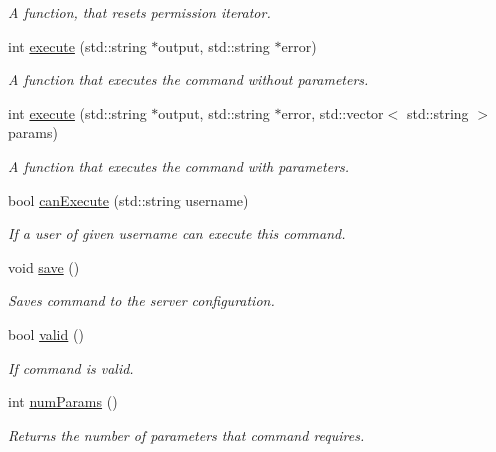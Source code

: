 \begin{DoxyCompactItemize}
\begin{DoxyCompactList}\small\item\em A function, that resets permission iterator. \end{DoxyCompactList}\item 
int \hyperlink{class_r_c_f_1_1_server_1_1_command_a2bfddcda74c6eaf33c7305cbfb69abf6}{execute} (std\+::string $\ast$output, std\+::string $\ast$error)
\begin{DoxyCompactList}\small\item\em A function that executes the command without parameters. \end{DoxyCompactList}\item 
int \hyperlink{class_r_c_f_1_1_server_1_1_command_a3d73b9e428db4ae2bd37af0a248ab140}{execute} (std\+::string $\ast$output, std\+::string $\ast$error, std\+::vector$<$ std\+::string $>$ params)
\begin{DoxyCompactList}\small\item\em A function that executes the command with parameters. \end{DoxyCompactList}\item 
bool \hyperlink{class_r_c_f_1_1_server_1_1_command_afc1653d931edf877589896652b2f8989}{can\+Execute} (std\+::string username)
\begin{DoxyCompactList}\small\item\em If a user of given username can execute this command. \end{DoxyCompactList}\item 
\hypertarget{class_r_c_f_1_1_server_1_1_command_a4c93565542dea516b7c3d968f5125a4b}{}void \hyperlink{class_r_c_f_1_1_server_1_1_command_a4c93565542dea516b7c3d968f5125a4b}{save} ()\label{class_r_c_f_1_1_server_1_1_command_a4c93565542dea516b7c3d968f5125a4b}

\begin{DoxyCompactList}\small\item\em Saves command to the server configuration. \end{DoxyCompactList}\item 
bool \hyperlink{class_r_c_f_1_1_server_1_1_command_ac8907eca3fca9c0fad927f3a04296b6f}{valid} ()
\begin{DoxyCompactList}\small\item\em If command is valid. \end{DoxyCompactList}\item 
int \hyperlink{class_r_c_f_1_1_server_1_1_command_a99a2d8045b47d6c7d7515d02d0e547ea}{num\+Params} ()
\begin{DoxyCompactList}\small\item\em Returns the number of parameters that command requires. \end{DoxyCompactList}\end{DoxyCompactItemize}
